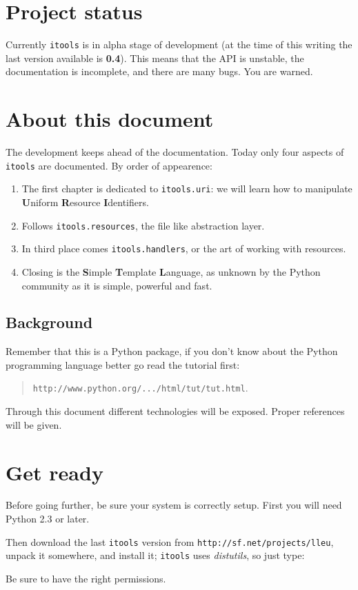 \section{Project status}

Currently {\tt itools} is in alpha stage of development (at the time of
this writing the last version available is {\bf 0.4}). This means that the
API is unstable, the documentation is incomplete, and there are many bugs.
You are warned.

\section{About this document}

The development keeps ahead of the documentation. Today only four aspects
of {\tt itools} are documented. By order of appearence:

\begin{enumerate}
  \item The first chapter is dedicated to {\tt itools.uri}: we will learn how
    to manipulate {\bf U}niform {\bf R}esource {\bf I}dentifiers.

  \item Follows {\tt itools.resources}, the file like abstraction layer.

  \item In third place comes {\tt itools.handlers}, or the art of working
    with resources.

  \item Closing is the {\bf S}imple {\bf T}emplate {\bf L}anguage, as unknown
    by the Python community as it is simple, powerful and fast.
\end{enumerate}


\subsection{Background}

Remember that this is a Python package, if you don't know about the Python
programming language better go read the tutorial first:

\begin{quote}
  {\tt http://www.python.org/.../html/tut/tut.html}.
\end{quote}

Through this document different technologies will be exposed. Proper
references will be given.

\section{Get ready}

Before going further, be sure your system is correctly setup. First you
will need Python 2.3 or later.

Then download the last {\tt itools} version from
{\tt http://sf.net/projects/lleu}, unpack it somewhere, and install it;
{\tt itools} uses {\em distutils}, so just type:


Be sure to have the right permissions.

